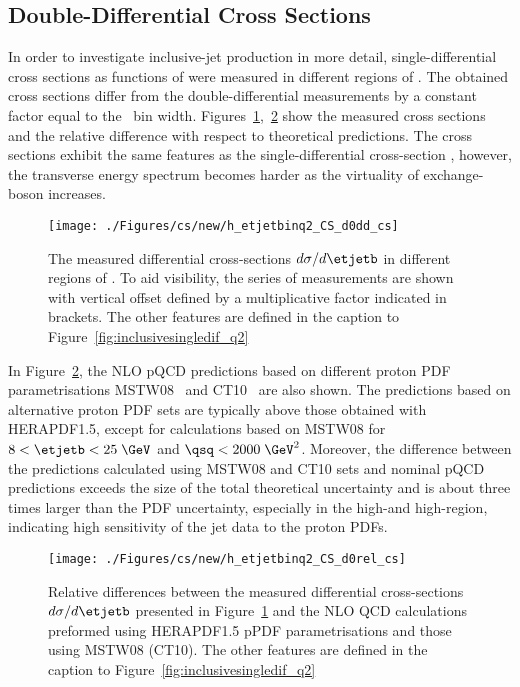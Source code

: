 \subsection{Double-Differential Cross Sections}
In order to investigate inclusive-jet production in more detail, single-differential cross sections as functions of \etjetb were measured in different regions of \qsq. The obtained cross sections differ from the double-differential measurements by a constant factor equal to the \qsq~bin width. Figures~\ref{fig:inclusive_doubledif},~\ref{fig:inclusive_doubledif_rel} show the measured cross sections and the relative difference with respect to theoretical predictions. The cross sections exhibit the same features as the single-differential cross-section \dsdetjetb, however, the transverse energy spectrum becomes harder as the virtuality of exchange-boson increases.
%
\begin{figure}[p]
	\centering
		\texttt{[image: ./Figures/cs/new/h\_etjetbinq2\_CS\_d0dd\_cs]}
	\caption{The measured differential cross-sections $d\sigma/d\etjetb$ in different regions of \qsq. To aid visibility, the series of measurements are shown with vertical offset defined by a multiplicative factor indicated in brackets. The other features are defined in the caption to Figure~\ref{fig:inclusivesingledif_q2}}
	\label{fig:inclusive_doubledif}
\end{figure}

In Figure~\ref{fig:inclusive_doubledif_rel}, the NLO pQCD predictions based on different proton PDF parametrisations MSTW08~\cite{Martin:2009iq} and CT10~\cite{Gao:2013xoa} are also shown. The predictions based on alternative proton PDF sets are typically above those obtained with HERAPDF1.5, except for calculations based on MSTW08 for $8 < \etjetb <25\;\GeV$ and $\qsq<2000\;\GeV^2$. Moreover, the difference between the predictions calculated using MSTW08 and CT10 sets and nominal pQCD predictions exceeds the size of the total theoretical uncertainty and is about three times larger than the PDF uncertainty, especially in the high-\etjetb and high-\qsq region, indicating high sensitivity of the jet data to the proton PDFs.
\begin{figure}[p]
	\centering
		\texttt{[image: ./Figures/cs/new/h\_etjetbinq2\_CS\_d0rel\_cs]}
  \caption{Relative differences between the measured differential cross-sections $d\sigma/d\etjetb$ presented in Figure~\ref{fig:inclusive_doubledif} and the NLO QCD calculations preformed using HERAPDF1.5 pPDF parametrisations and those using MSTW08 (CT10). The other features are defined in the caption to Figure~\ref{fig:inclusivesingledif_q2}}
	\label{fig:inclusive_doubledif_rel}
\end{figure}

